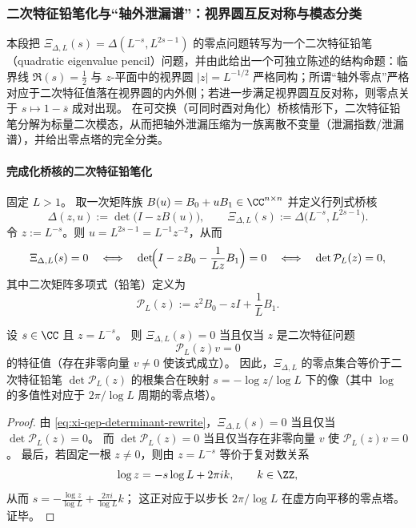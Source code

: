 \subsubsection{二次特征铅笔化与“轴外泄漏谱”：视界圆互反对称与模态分类}\label{subsubsec:xi-quadratic-pencil-leakage-spectrum}
本段把 \(\Xi_{\Delta,L}(s)=\Delta(L^{-s},L^{2s-1})\) 的零点问题转写为一个二次特征铅笔（quadratic eigenvalue pencil）问题，并由此给出一个可独立陈述的结构命题：临界线 \(\Re(s)=\tfrac12\) 与 \(z\)-平面中的视界圆 \(|z|=L^{-1/2}\) 严格同构；所谓“轴外零点”严格对应于二次特征值落在视界圆的内外侧；若进一步满足视界圆互反对称，则零点关于 \(s\mapsto 1-\overline{s}\) 成对出现。
在可交换（可同时酉对角化）桥核情形下，二次特征铅笔分解为标量二次模态，从而把轴外泄漏压缩为一族离散不变量（泄漏指数/泄漏谱），并给出零点塔的完全分类。

\paragraph{完成化桥核的二次特征铅笔化}
固定 \(L>1\)。
取一次矩阵族 \(B(u)=B_0+uB_1\in\CC^{n\times n}\) 并定义行列式桥核
\[
\Delta(z,u):=\det\!\bigl(I-zB(u)\bigr),
\qquad
\Xi_{\Delta,L}(s):=\Delta\!\bigl(L^{-s},L^{2s-1}\bigr).
\]
令 \(z:=L^{-s}\)。则 \(u=L^{2s-1}=L^{-1}z^{-2}\)，从而
\begin{equation}\label{eq:xi-qep-determinant-rewrite}
\Xi_{\Delta,L}(s)=0
\quad\Longleftrightarrow\quad
\det\!\Bigl(I-zB_0-\frac{1}{Lz}B_1\Bigr)=0
\quad\Longleftrightarrow\quad
\det \mathcal{P}_L(z)=0,
\end{equation}
其中二次矩阵多项式（铅笔）定义为
\begin{equation}\label{eq:xi-qep-PL-def}
\mathcal{P}_L(z):=z^2B_0-zI+\frac1L B_1.
\end{equation}

\begin{theorem}[零点—二次特征值等价]\label{thm:xi-qep-zero-equivalence}
设 \(s\in\CC\) 且 \(z=L^{-s}\)。
则 \(\Xi_{\Delta,L}(s)=0\) 当且仅当 \(z\) 是二次特征问题
\[
\mathcal{P}_L(z)v=0
\]
的特征值（存在非零向量 \(v\neq 0\) 使该式成立）。
因此，\(\Xi_{\Delta,L}\) 的零点集合等价于二次特征铅笔 \(\det \mathcal{P}_L(z)\) 的根集合在映射 \(s=-\log z/\log L\) 下的像（其中 \(\log\) 的多值性对应于 \(2\pi/\log L\) 周期的零点塔）。
\end{theorem}

\begin{proof}
由 \eqref{eq:xi-qep-determinant-rewrite}，\(\Xi_{\Delta,L}(s)=0\) 当且仅当 \(\det \mathcal{P}_L(z)=0\)。
而 \(\det \mathcal{P}_L(z)=0\) 当且仅当存在非零向量 \(v\) 使 \(\mathcal{P}_L(z)v=0\)。
最后，若固定一根 \(z\neq 0\)，则由 \(z=L^{-s}\) 等价于复对数关系
\[
\log z=-s\log L+2\pi i k,\qquad k\in\ZZ,
\]
从而
\(
s=-\frac{\log z}{\log L}+\frac{2\pi i}{\log L}k
\)；
这正对应于以步长 \(2\pi/\log L\) 在虚方向平移的零点塔。证毕。
\end{proof}

